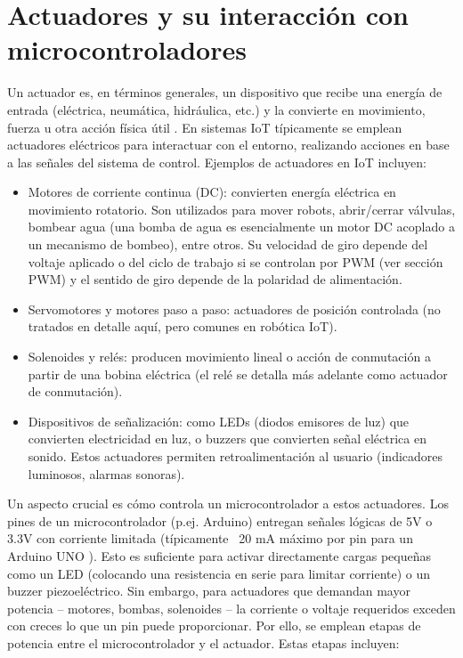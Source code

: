 \section{Actuadores y su interacción con microcontroladores}
Un actuador es, en términos generales, un dispositivo que recibe una energía de entrada (eléctrica, neumática, hidráulica, etc.) y la convierte en movimiento, fuerza u otra acción física útil \cite{Actuadores-2}. En sistemas IoT típicamente se emplean actuadores eléctricos para interactuar con el entorno, realizando acciones en base a las señales del sistema de control. Ejemplos de actuadores en IoT incluyen:
\begin{itemize}
    \item Motores de corriente continua (DC): convierten energía eléctrica en movimiento rotatorio. Son utilizados para mover robots, abrir/cerrar válvulas, bombear agua (una bomba de agua es esencialmente un motor DC acoplado a un mecanismo de bombeo), entre otros. Su velocidad de giro depende del voltaje aplicado o del ciclo de trabajo si se controlan por PWM (ver sección PWM) y el sentido de giro depende de la polaridad de alimentación.
    \item Servomotores y motores paso a paso: actuadores de posición controlada (no tratados en detalle aquí, pero comunes en robótica IoT).
    \item Solenoides y relés: producen movimiento lineal o acción de conmutación a partir de una bobina eléctrica (el relé se detalla más adelante como actuador de conmutación).
    \item Dispositivos de señalización: como LEDs (diodos emisores de luz) que convierten electricidad en luz, o buzzers que convierten señal eléctrica en sonido. Estos actuadores permiten retroalimentación al usuario (indicadores luminosos, alarmas sonoras).
\end{itemize}
Un aspecto crucial es cómo controla un microcontrolador a estos actuadores. Los pines de un microcontrolador (p.ej. Arduino) entregan señales lógicas de 5V o 3.3V con corriente limitada (típicamente ~20 mA máximo por pin para un Arduino UNO \cite{Arduino2024DigitalPins}). Esto es suficiente para activar directamente cargas pequeñas como un LED (colocando una resistencia en serie para limitar corriente) o un buzzer piezoeléctrico. Sin embargo, para actuadores que demandan mayor potencia – motores, bombas, solenoides – la corriente o voltaje requeridos exceden con creces lo que un pin puede proporcionar. Por ello, se emplean etapas de potencia entre el microcontrolador y el actuador. Estas etapas incluyen:
